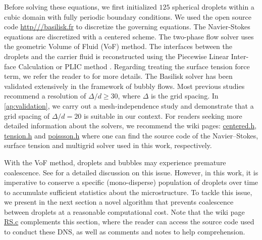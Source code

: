 Before solving these equations, we first initialized $125$ spherical droplets within a cubic domain with fully periodic boundary conditions. 
We used the open source code \url{http///basilisk.fr} to discretize the governing equations. 
The Navier-Stokes equations are discretized with a centered scheme.
The two-phase flow solver uses the geometric Volume of Fluid (VoF) method. 
The interfaces between the droplets and the carrier fluid is reconstructed using the Piecewise Linear Inter-face Calculation or PLIC method \citet[Chapter 5.]{tryggvason2011direct}.
Regarding treating the surface tension force term, we refer the reader to \citet{popinet2018numerical} for more details. 
The Basilisk solver has been validated extensively in the framework of bubbly flows. 
Most previous studies \citep{hidman2023assessing,innocenti2020direct} recommend a resolution of $\Delta/d \ge  30$, where $\Delta$ is the grid spacing. 
In \ref{ap:validation}, we carry out a mesh-independence study and demonstrate that a grid spacing of $\Delta/d = 20$ is suitable in our context.
For readers seeking more detailed information about the solvers, we recommend the wiki pages: \href{http://basilisk.fr/src/navier-stokes/centered.h}{centered.h}, \href{http://basilisk.fr/src/tension.h}{tension.h} and \href{http://basilisk.fr/src/poissson.h}{poissson.h} where one can find the source code of the Navier--Stokes, surface tension and multigrid solver used in this work, respectively. 

With the VoF method, droplets and bubbles may experience premature coalescence.
See \citet[Appendix B]{innocenti2020direct} for a detailed discussion on this issue.
However, in this work, it is imperative to conserve a specific (mono-disperse) population of droplets over time to accumulate sufficient statistics about the microstructure.
To tackle this issue, we present in the next section a novel algorithm that prevents coalescence between droplets at a reasonable computational cost. 
Note that the wiki page \href{http://basilisk.fr/sandbox/fintzin/Rising-suspension/RS.c}{RS.c} complements this section, where the reader can access the source code used to conduct these DNS, as well as comments and notes to help comprehension. 




